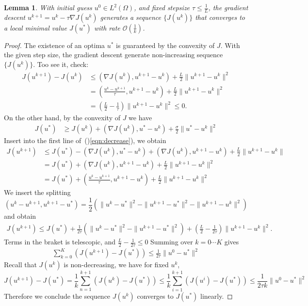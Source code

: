 \documentclass{article}
\newtheorem{lemma}[theorem]{Lemma}
\begin{document}
\begin{lemma}
    With initial guess $u^0\in L^2(\Omega)$, and fixed stepsize $\tau\leq\frac{1}{L}$, the gradient descent $u^{k+1}=u^k-\tau\nabla J(u^k)$ generates a sequence $\{J(u^k)\}$ that converges to a local minimal value $J(u^*)$ with rate $\mathcal{O}(\frac{1}{k})$.
\end{lemma}
\begin{proof}
The existence of an optima $u^*$ is guaranteed by the convexity of $J$. With the given step size, the gradient descent generate non-increasing sequence $\{J(u^k)\}$. Too see it, check:
\begin{equation}\label{eqn:decrease}
\begin{aligned}
J(u^{k+1})-J(u^{k})&\leq (\nabla J(u^k),u^{k+1}-u^k)+\frac{L}{2}\|u^{k+1}-u^k\|^2 \\
&= (\frac{u^k-u^{k+1}}{\tau},u^{k+1}-u^k)+\frac{L}{2}\|u^{k+1}-u^k\|^2 \\ 
&=(\frac{L}{2}-\frac{1}{\tau})\|u^{k+1}-u^k\|^2\leq0.
\end{aligned}
\end{equation}
On the other hand, by the convexity of $J$ we have 
\begin{align*}
    J(u^*)&\geq J(u^k)+(\nabla J(u^k),u^*-u^k)+\frac{\sigma}{2}\|u^*-u^k\|^2
\end{align*}
Insert into the first line of~()\ref{eqn:decrease}), we obtain
\begin{align*}
    J(u^{k+1})&\leq J(u^*)-(\nabla J(u^k),u^*-u^k)+(\nabla J(u^k),u^{k+1}-u^k)+\frac{L}{2}\|u^{k+1}-u^k\| \\ 
    &=J(u^*)+(\nabla J(u^k),u^{k+1}-u^k)+\frac{L}{2}\|u^{k+1}-u^k\|^2 \\ 
    &=J(u^*)+(\frac{u^k-u^{k+1}}{\tau},u^{k+1}-u^k)+\frac{L}{2}\|u^{k+1}-u^k\|^2
\end{align*}
We insert the splitting 
\[
    (u^k-u^{k+1},u^{k+1}-u^*)=\frac{1}{2}(\|u^k-u^*\|^2-\|u^{k+1}-u^*\|^2-\|u^{k+1}-u^k\|^2)
\]
and obtain 
\begin{align*}
    J(u^{k+1})\leq J(u^*)+\frac{1}{2\tau}(\|u^k-u^*\|^2-\|u^{k+1}-u^*\|^2)+(\frac{L}{2}-\frac{1}{2\tau})\|u^{k+1}-u^k\|^2.
\end{align*}
Terms in the braket is telescopic, and $\frac{L}{2}-\frac{1}{2\tau}\leq0$ Summing over $k=0\cdots K$ gives 
\begin{align*}
    \sum_{k=0}^K(J(u^{k+1})-J(u^*))\leq \frac{1}{2\tau}\|u^0-u^*\|^2
\end{align*}
Recall that $J(u^k)$ is non-decreasing, we have for fixed $u^k$, 
\[
    J(u^{k+1})-J(u^*)=\frac{1}{k}\sum_{n=1}^{k+1}(J(u^k)-J(u^*))\leq \frac{1}{k}\sum_{i=1}^{k+1}(J(u^{i})-J(u^*))\leq \frac{1}{2\tau k}\|u^0-u^*\|^2
\]
Therefore we conclude the sequence $J(u^{k})$ converges to $J(u^*)$ linearly.
\end{proof}
\end{document}
